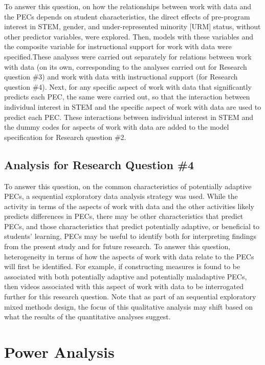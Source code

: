 \documentclass[]{book}
\theoremstyle{definition}
\theoremstyle{definition}
\theoremstyle{definition}
\theoremstyle{remark}
\begin{document}
To answer this question, on how the relationships between work with data
and the PECs depends on student characteristics, the direct effects of
pre-program interest in STEM, gender, and under-represented minority
{[}URM{]} status, without other predictor variables, were explored.
Then, models with these variables and the composite variable for
instructional support for work with data were specified.These analyses
were carried out separately for relations between work with data (on its
own, corresponding to the analyses carried out for Research question
\#3) and work with data with instructional support (for Research
question \#4). Next, for any specific aspect of work with data that
significantly predicts each PEC, the same were carried out, so that the
interaction between individual interest in STEM and the specific aspect
of work with data are used to predict each PEC. These interactions
between individual interest in STEM and the dummy codes for aspects of
work with data are added to the model specification for Research
question \#2.

\subsection{Analysis for Research Question
\#4}\label{analysis-for-research-question-4}

To answer this question, on the common characteristics of potentially
adaptive PECs, a sequential exploratory data analysis strategy was used.
While the activity in terms of the aspects of work with data and the
other activities likely predicts differences in PECs, there may be other
characteristics that predict PECs, and those characteristics that
predict potentially adaptive, or beneficial to students' learning, PECs
may be useful to identify both for interpreting findings from the
present study and for future research. To answer this question,
heterogeneity in terms of how the aspects of work with data relate to
the PECs will first be identified. For example, if constructing measures
is found to be associated with both potentially adaptive and potentially
maladaptive PECs, then videos associated with this aspect of work with
data to be interrogated further for this research question. Note that as
part of an sequential exploratory mixed methods design, the focus of
this qualitative analysis may shift based on what the results of the
quantitative analyses suggest.

\section{Power Analysis}\label{power-analysis}
\end{document}
